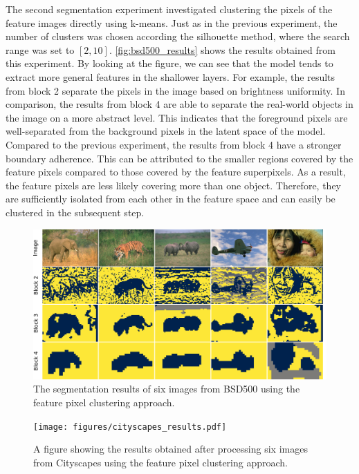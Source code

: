 The second segmentation experiment investigated clustering the pixels of the feature images directly using k-means. Just as in the previous experiment, the number of clusters was chosen according the silhouette method, where the search range was set to $[2, 10]$. \autoref{fig:bsd500_results} shows the results obtained from this experiment. By looking at the figure, we can see that the model tends to extract more general features in the shallower layers. For example, the results from block 2 separate the pixels in the image based on brightness uniformity. In comparison, the results from block 4 are able to separate the real-world objects in the image on a more abstract level. This indicates that the foreground pixels are well-separated from the background pixels in the latent space of the model. Compared to the previous experiment, the results from block 4 have a stronger boundary adherence. This can be attributed to the smaller regions covered by the feature pixels compared to those covered by the feature superpixels. As a result, the feature pixels are less likely covering more than one object. Therefore, they are sufficiently isolated from each other in the feature space and can easily be clustered in the subsequent step.

\begin{figure}[thbp]
    \centering
    \includegraphics[width=\textwidth]{figures/bsd500_results.pdf}
    \caption{The segmentation results of six images from BSD500 using the feature pixel clustering approach.}
    \label{fig:bsd500_results}
\end{figure}

\begin{figure}[thbp]
    \centering
    \texttt{[image: figures/cityscapes\_results.pdf]}
    \caption{A figure showing the results obtained after processing six images from Cityscapes using the feature pixel clustering approach.}
    \label{fig:cityscapes_results}
\end{figure}

